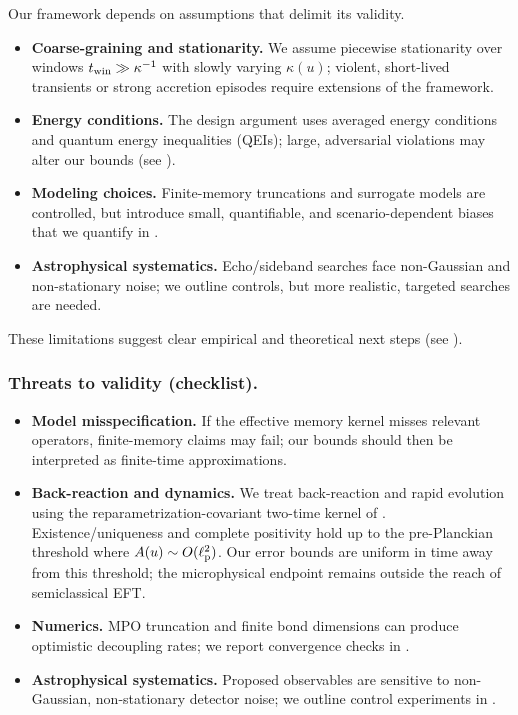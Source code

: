 \documentclass[aps,prd,preprint,onecolumn,superscriptaddress,nofootinbib,longbibliography,floatfix,11pt,showpacs,showkeys]{revtex4-2}
\theoremstyle{plain}
\theoremstyle{definition}
\theoremstyle{remark}
\begin{document}
Our framework depends on assumptions that delimit its validity.
\begin{itemize}[leftmargin=*]
  \item \textbf{Coarse-graining and stationarity.} We assume piecewise stationarity over windows $t_{\rm win}\gg \kappa^{-1}$ with slowly varying $\kappa(u)$; violent, short-lived transients or strong accretion episodes require extensions of the framework.
  \item \textbf{Energy conditions.} The design argument uses averaged energy conditions and quantum energy inequalities (QEIs); large, adversarial violations may alter our bounds (see ).
  \item \textbf{Modeling choices.} Finite-memory truncations and surrogate models are controlled, but introduce small, quantifiable, and scenario-dependent biases that we quantify in .
  \item \textbf{Astrophysical systematics.} Echo/sideband searches face non-Gaussian and non-stationary noise; we outline controls, but more realistic, targeted searches are needed.
\end{itemize}
These limitations suggest clear empirical and theoretical next steps (see ).

\subsubsection{Threats to validity (checklist).}
\begin{itemize}[leftmargin=*,itemsep=0.25em]
  \item \textbf{Model misspecification.} If the effective memory kernel misses relevant operators, finite-memory claims may fail; our bounds should then be interpreted as finite-time approximations.
  \item \textbf{Back-reaction and dynamics.} We treat back-reaction and rapid evolution using the reparametrization-covariant two-time kernel of . Existence/uniqueness and complete positivity hold up to the pre-Planckian threshold where $A(u)\sim O(\ell_{\rm p}^2)$. Our error bounds are uniform in time away from this threshold; the microphysical endpoint remains outside the reach of semiclassical EFT.
  \item \textbf{Numerics.} MPO truncation and finite bond dimensions can produce optimistic decoupling rates; we report convergence checks in .
  \item \textbf{Astrophysical systematics.} Proposed observables are sensitive to non-Gaussian, non-stationary detector noise; we outline control experiments in .
\end{itemize}
\end{document}
